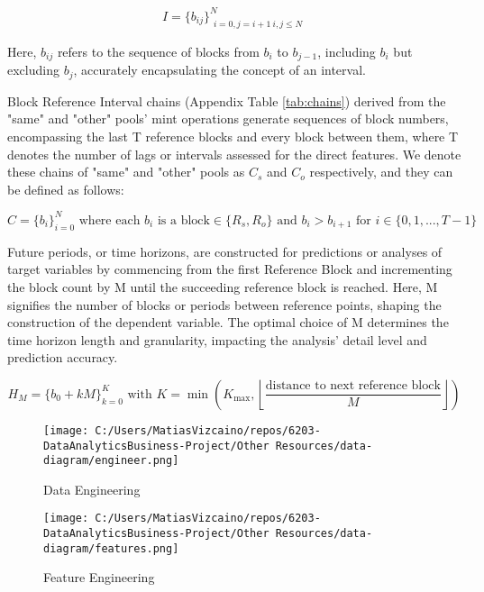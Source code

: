 \documentclass{article}
\begin{document}
\begin{equation}
I = \{b_{ij}\}_{\substack{i=0,j=i+1 \ i,j\leq N}}^N
\end{equation}

Here, $b_{ij}$ refers to the sequence of blocks from $b_i$ to $b_{j-1}$, including $b_i$ but excluding $b_j$, accurately encapsulating the concept of an interval.

Block Reference Interval chains (Appendix Table \ref{tab:chains}) derived from the "same" and "other" pools' mint operations generate sequences of block numbers, encompassing the last T reference blocks and every block between them, where T denotes the number of lags or intervals assessed for the direct features. We denote these chains of "same" and "other" pools as $C_{s}$ and $C_{o}$ respectively, and they can be defined as follows:

\begin{equation}
C = \{b_{i}\}_{i=0}^{N} \text{ where each } b_{i} \text{ is a block} \in \{R_s, R_o\} \text{ and } b_{i} > b_{i+1} \text{ for } i \in \{0,1,...,T-1\}
\end{equation}

Future periods, or time horizons, are constructed for predictions or analyses of target variables by commencing from the first Reference Block and incrementing the block count by M until the succeeding reference block is reached. Here, M signifies the number of blocks or periods between reference points, shaping the construction of the dependent variable. The optimal choice of M determines the time horizon length and granularity, impacting the analysis' detail level and prediction accuracy.

\begin{equation}
H_{M} = \{b_{0}+kM\}_{k=0}^{K} \text{ with } K = \min \left( K_{\text{max}}, \left\lfloor \frac{\text{distance to next reference block}}{M} \right\rfloor \right)
\end{equation}

\begin{figure}[htbp]
  \begin{minipage}{0.5\textwidth}
  \centering
  \texttt{[image: C:/Users/MatiasVizcaino/repos/6203-DataAnalyticsBusiness-Project/Other Resources/data-diagram/engineer.png]}
  \caption{Data Engineering}
  \label{fig:data-diagram-engineer}
  \end{minipage}
  \begin{minipage}{0.45\textwidth}
  \centering
  \texttt{[image: C:/Users/MatiasVizcaino/repos/6203-DataAnalyticsBusiness-Project/Other Resources/data-diagram/features.png]}
  \caption{Feature Engineering}
  \label{fig:data-diagram-features}
  \end{minipage}
  \end{figure}
\end{document}
